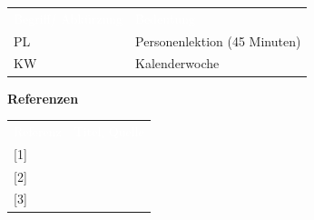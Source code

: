\documentclass[10pt,paper=a4,final]{scrartcl}
\begin{document}
\begin{tabularx}{\textwidth}{l X}
\textcolor{white}{Begriff/ Abk\"urzung}\cellcolor{blue!80!} & \textcolor{white}{Bedeutung}\cellcolor{blue!80!} \\
\cellcolor{blue!20!} PL & Personenlektion (45 Minuten) \cellcolor{blue!20!} \\
\cellcolor{blue!20!} KW & Kalenderwoche \cellcolor{blue!20!} \\
\end{tabularx}
\newline
\newline
\newline
{\bf Referenzen}
\newline

\begin{tabularx}{\textwidth}{l X}
\textcolor{white}{Referenz}\cellcolor{blue!80!} & \textcolor{white}{Titel, Quelle}\cellcolor{blue!80!} \\
\cellcolor{blue!20!}[1] & \cellcolor{blue!20!} \\
\cellcolor{blue!20!}[2] & \cellcolor{blue!20!} \\
\cellcolor{blue!20!}[3] & \cellcolor{blue!20!} \\
\end{tabularx}
\newpage
\end{document}
